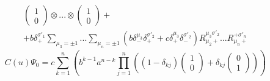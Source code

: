 \documentclass[12pt]{article}
\theoremstyle{definition}
\begin{document}
\begin{enumerate}
\begin{multline}
\begin{pmatrix}
            1\\
            0
        \end{pmatrix}\otimes...\otimes\begin{pmatrix}
            1\\
            0
        \end{pmatrix}+\\+b\delta^{\sigma'_1}_+\sum\limits_{\mu_3=\pm1}...\sum\limits_{\mu_n=\pm1}(b\delta^{\mu_3}_-\delta^{\sigma'_2}_++c\delta^{\mu_3}_+\delta^{\sigma'_2}_-)R^{\mu_3\sigma'_2}_{\mu_2+}...R^{+\sigma'_n}_{\mu_n+}
    \end{multline}
    \begin{equation}
        \boxed{C(u)\Psi_0=c\sum\limits_{k=1}^n\left(b^{k-1}a^{n-k}\prod\limits_{j=1}^n\left((1-\delta_{kj})\begin{pmatrix}
            1\\0
        \end{pmatrix}+\delta_{kj}\begin{pmatrix}
            0\\1
        \end{pmatrix}\right)\right)}
    \end{equation}
    \end{enumerate}
\end{document}
